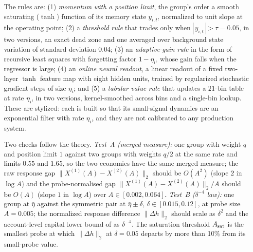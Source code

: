 \documentclass[12pt]{article}
\theoremstyle{definition}
\theoremstyle{remark}
\begin{document}
The rules are: (1) \emph{momentum with a position limit}, the group's order a smooth saturating ($\tanh$) function of its memory state $y_{i,t}$, normalized to unit slope at the operating point; (2) a \emph{threshold rule} that trades only when $|y_{i,t}|>\tau=0.05$, in two versions, an exact dead zone and one averaged over background state variation of standard deviation $0.04$; (3) an \emph{adaptive-gain rule} in the form of recursive least squares with forgetting factor $1-\eta_i$, whose gain falls when the regressor is large; (4) an \emph{online neural readout}, a linear readout of a fixed two-layer $\tanh$ feature map with eight hidden units, trained by regularized stochastic gradient steps of size $\eta_i$; and (5) a \emph{tabular value rule} that updates a 21-bin table at rate $\eta_i$, in two versions, kernel-smoothed across bins and a single-bin lookup. These are stylized: each is built so that its small-signal dynamics are an exponential filter with rate $\eta_i$, and they are not calibrated to any production system.

Two checks follow the theory. \emph{Test~A (merged measure):} one group with weight $q$ and position limit $1$ against two groups with weights $q/2$ at the same rate and limits $0.55$ and $1.65$, so the two economies have the same merged measure; the raw response gap $\|X^{(1)}(A)-X^{(2)}(A)\|_2$ should be $O(A^2)$ (slope $2$ in $\log A$) and the probe-normalised gap $\|X^{(1)}(A)-X^{(2)}(A)\|_2/A$ should be $O(A)$ (slope $1$ in $\log A$) over $A\in[0.002,0.064]$. \emph{Test~B ($\delta^{-4}$ law):} one group at $\bar\eta$ against the symmetric pair at $\bar\eta\pm\delta$, $\delta\in[0.015,0.12]$, at probe size $A=0.005$; the normalized response difference $\|\Delta h\|_2$ should scale as $\delta^2$ and the account-level capital lower bound of \citet{niroula2026a} as $\delta^{-4}$. The saturation threshold $A_{\rm sat}$ is the smallest probe at which $\|\Delta h\|_2$ at $\delta=0.05$ departs by more than 10\% from its small-probe value.
\end{document}

